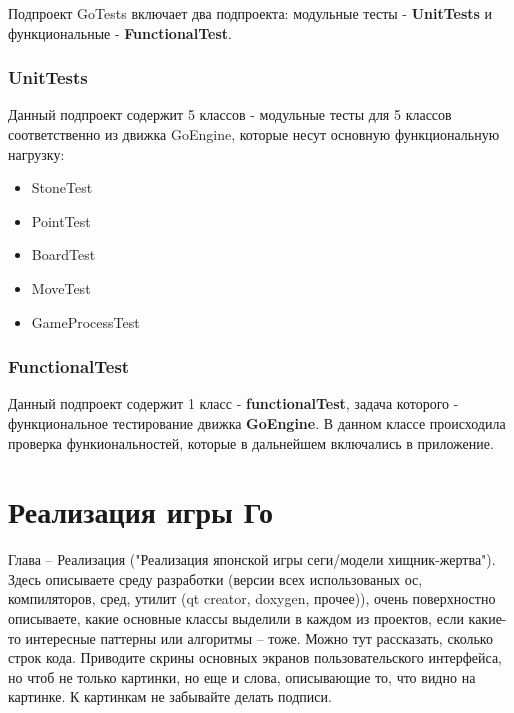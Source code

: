 Подпроект GoTests включает два подпроекта: модульные тесты - \textbf{UnitTests} и функциональные - \textbf{FunctionalTest}.\\

\subsubsection*{UnitTests}
Данный подпроект содержит 5 классов - модульные тесты для 5 классов соответственно из движка GoEngine, которые несут основную функциональную нагрузку:

\begin{itemize}
	\item StoneTest\\
	\item PointTest\\
	\item BoardTest\\
	\item MoveTest\\
	\item GameProcessTest\\
\end{itemize}

\subsubsection*{FunctionalTest}
Данный подпроект содержит 1 класс - \textbf{functionalTest}, задача которого - функциональное тестирование движка \textbf{GoEngine}. В данном классе происходила проверка функиональностей, которые в дальнейшем включались в приложение.

\section*{Реализация игры Го}

Глава -- Реализация ("Реализация японской игры сеги/модели хищник-жертва"). Здесь описываете среду разработки (версии всех использованых ос, компиляторов, сред, утилит (qt creator, doxygen, прочее)), очень поверхностно описываете, какие основные классы выделили в каждом из проектов, если какие-то интересные паттерны или алгоритмы -- тоже. Можно тут рассказать, сколько строк кода. Приводите скрины основных экранов пользовательского интерфейса, но чтоб не только картинки, но еще и слова, описывающие то, что видно на картинке. К картинкам не забывайте делать подписи.


